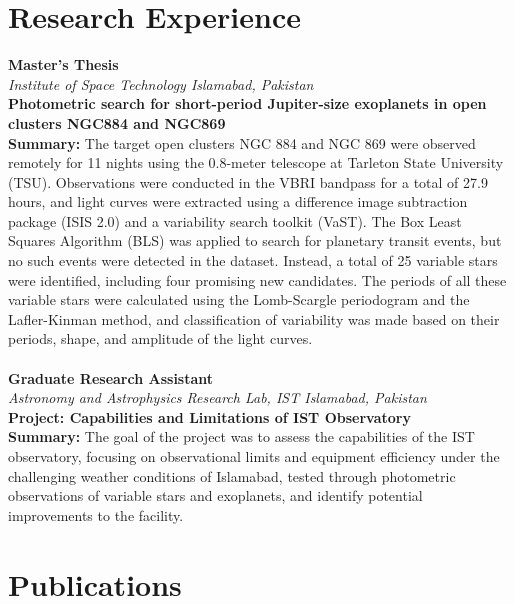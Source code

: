 \documentclass{article}
\begin{document}
\section*{Research Experience}
\vspace{-\baselineskip}
\noindent\makebox[\linewidth]{\rule{\textwidth}{0.4pt}}
 \textbf{Master’s Thesis} \\
    \textit{Institute of Space Technology \hfill Islamabad, Pakistan} \\
    \textbf{Photometric search for short-period Jupiter-size exoplanets in open clusters NGC884 and NGC869} \\
    \textbf{Summary:} The target open clusters NGC 884 and NGC 869 were observed remotely for 11 nights using the 0.8-meter telescope at Tarleton State University (TSU). Observations were conducted in the VBRI bandpass for a total of 27.9 hours, and light curves were extracted using a difference image subtraction package (ISIS 2.0) and a variability search toolkit (VaST). The Box Least Squares Algorithm (BLS) was applied to search for planetary transit events, but no such events were detected in the dataset. Instead, a total of 25 variable stars were identified, including four promising new candidates. The periods of all these variable stars were calculated using the Lomb-Scargle periodogram and the Lafler-Kinman method, and classification of variability was made based on their periods, shape, and amplitude of the light curves. \\ \\
\textbf{Graduate Research Assistant} \\
    \textit{Astronomy and Astrophysics Research Lab, IST \hfill Islamabad, Pakistan} \\
    \textbf{ Project: Capabilities and Limitations of IST Observatory} \\
    \textbf{Summary:} The goal of the project was to assess the capabilities of the IST observatory, focusing on observational limits and equipment efficiency under the challenging weather conditions of Islamabad, tested through photometric observations of variable stars and exoplanets, and identify potential improvements to the facility.

     
\section*{Publications}
\vspace{-\baselineskip}
\noindent\makebox[\linewidth]{\rule{\textwidth}{0.4pt}}
\end{document}
